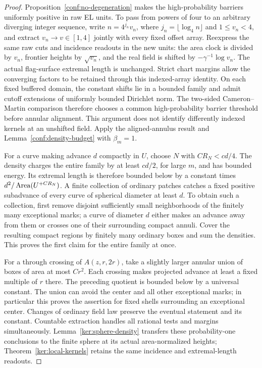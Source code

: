 \begin{proof}
Proposition~\ref{conf:no-degeneration} makes the high-probability
barriers uniformly positive in raw EL units. To pass from powers of four
to an arbitrary diverging integer sequence, write
$n=4^{j_n}v_n$, where $j_n=\lfloor\log_4 n\rfloor$ and $1\le v_n<4$,
and extract $v_n\to v\in[1,4]$ jointly with every fixed offset array.
Reexpress the same raw cuts and incidence readouts in the new units:
the area clock is divided by $v_n$, frontier heights by $\sqrt{v_n}$,
and the real field is shifted by $-\gamma^{-1}\log v_n$.
The actual flag-surface extremal length is unchanged. Strict chart
margins allow the converging factors to be retained through this
indexed-array identity. On each fixed buffered domain, the constant
shifts lie in a bounded family and admit cutoff extensions of uniformly
bounded Dirichlet norm. The two-sided Cameron--Martin comparison
therefore chooses a common high-probability barrier threshold before
annular alignment. This argument does not identify differently indexed
kernels at an unshifted field. Apply the aligned-annulus result and
Lemma~\ref{conf:density-budget} with \(\beta_m=1\).

For a curve making advance \(d\) compactly in \(U\), choose \(N\)
with \(CR_N<cd/4\).  The density charges the entire family by at
least \(cd/2\), for large \(m\), and has bounded energy.  Its
extremal length is therefore bounded below by a constant times
\(d^2/\operatorname{Area}(U^{+CR_N})\).  A finite collection of ordinary patches
catches a fixed positive subadvance of every curve of spherical
diameter at least \(d\).  To obtain such a collection, first remove
disjoint sufficiently small neighborhoods of the finitely many
exceptional marks; a curve of diameter \(d\) either makes an
advance away from them or crosses one of their surrounding compact
annuli.  Cover the resulting compact regions by finitely many
ordinary boxes and sum the densities.  This proves the first claim
for the entire family at once.

For a through crossing of \(A(z,r,2r)\), take a slightly larger
annular union of boxes of area at most \(Cr^2\).  Each crossing
makes projected advance at least a fixed multiple of \(r\) there.
The preceding quotient is bounded below by a universal constant.
The union can avoid the center and all other exceptional marks; in
particular this proves the assertion for fixed shells surrounding
an exceptional center.  Changes of ordinary field law preserve the
eventual statement and its constant.  Countable extraction handles
all rational tests and margins simultaneously. Lemma~\ref{ker:sphere-density}
transfers these probability-one conclusions to the finite sphere at its
actual area-normalized heights; Theorem~\ref{ker:local-kernels} retains
the same incidence and extremal-length readouts.
\end{proof}

